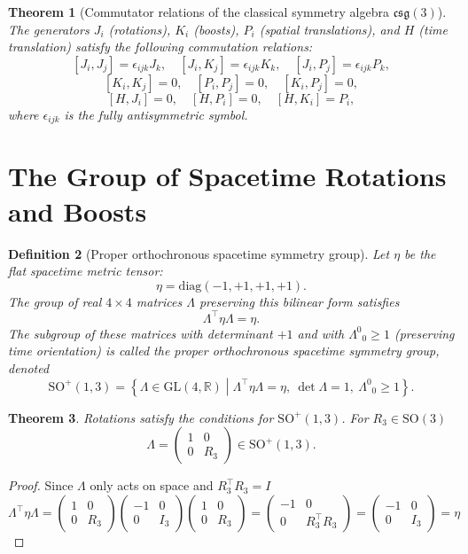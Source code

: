 \documentclass{amsart}
\newtheorem{theorem}{Theorem}[section]
\newtheorem{definition}[theorem]{Definition}
\theoremstyle{remark}
\begin{document}
\begin{theorem}[Commutator relations of the classical symmetry algebra $\mathfrak{csg}(3)$]
  The generators \(J_i\) (rotations), \(K_i\) (boosts), \(P_i\) (spatial translations), and \(H\) (time translation) satisfy the following commutation relations:
  \[
  [J_i, J_j] = \epsilon_{ijk} J_k, \quad
  [J_i, K_j] = \epsilon_{ijk} K_k, \quad
  [J_i, P_j] = \epsilon_{ijk} P_k,
  \]
  \[
  [K_i, K_j] = 0, \quad
  [P_i, P_j] = 0, \quad
  [K_i, P_j] = 0,
  \]
  \[
  [H, J_i] = 0, \quad
  [H, P_i] = 0, \quad
  [H, K_i] = P_i,
  \]
  where $\epsilon_{ijk}$ is the fully antisymmetric symbol.
\end{theorem}

\section{The Group of Spacetime Rotations and Boosts}
\begin{definition}[Proper orthochronous spacetime symmetry group]
  Let $\eta$ be the flat spacetime metric tensor:
  \[
  \eta = \mathrm{diag}(-1, +1, +1, +1).
  \]
  The group of real $4 \times 4$ matrices $\Lambda$ preserving this bilinear form satisfies
  \[
  \Lambda^\top \eta \Lambda = \eta.
  \]
  The subgroup of these matrices with determinant $+1$ and with $\Lambda^0{}_0 \geq 1$ (preserving time orientation) is called the \emph{proper orthochronous spacetime symmetry group}, denoted
  \[
  \mathrm{SO}^+(1,3) = \left\{ \Lambda \in \mathrm{GL}(4,\mathbb{R}) \middle| \Lambda^\top \eta \Lambda = \eta,\ \det \Lambda = 1,\ \Lambda^0{}_0 \geq 1 \right\}.
  \]
\end{definition}

\begin{theorem}
  Rotations satisfy the conditions for $\mathrm{SO}^+(1,3)$. For $R_3\in\mathrm{SO}(3)$
  \[
  \Lambda = 
  \begin{pmatrix}
    1 & 0 \\
    0 & R_3
  \end{pmatrix} \in \mathrm{SO}^+(1,3).
  \]
\end{theorem}
\begin{proof}
  Since $\Lambda$ only acts on space and $R_3^\top R_3=I$
  \[
  \Lambda^\top\eta \Lambda =
  \begin{pmatrix}
    1 & 0 \\
    0 & R_3
  \end{pmatrix}
  \begin{pmatrix}
    -1 & 0 \\
    0 & I_3
  \end{pmatrix}
  \begin{pmatrix}
    1 & 0 \\
    0 & R_3
  \end{pmatrix} =
  \begin{pmatrix}
    -1 & 0 \\
    0 & R_3^\top R_3
  \end{pmatrix} =
  \begin{pmatrix}
    -1 & 0 \\
    0 & I_3
  \end{pmatrix}
  = \eta  
  \]
\end{proof}
\end{document}
